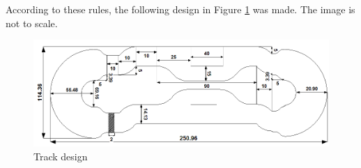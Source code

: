 According to these rules, the following design in Figure \ref{fig:TrackDesign} was made. The image is not to scale.

\begin{figure}[ht]
    \includegraphics[width=1\textwidth]{Images/Design/TrackDesign.PNG}
    \caption{Track design}
    \label{fig:TrackDesign}
\end{figure}








